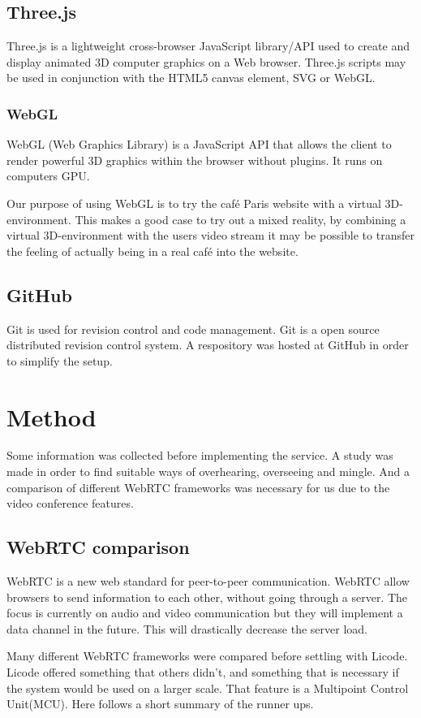 \documentclass[12pt, titlepage]{article}
\begin{document}
\subsection{Three.js}
Three.js\cite{34} is a lightweight cross-browser JavaScript library/API used to create and display animated 3D computer graphics on a Web browser. Three.js scripts may be used in conjunction with the HTML5 canvas element, SVG or WebGL.
\subsubsection{WebGL}
WebGL (Web Graphics Library) is a JavaScript API that allows the client to render powerful 3D graphics within the browser without plugins. It runs on computers GPU.

Our purpose of using WebGL is to try the café Paris website with a virtual 3D-environment. This makes a good case to try out a mixed reality, by combining a virtual 3D-environment with the users video stream it may be possible to transfer the feeling of actually being in a real café into the website.
\subsection{GitHub}
Git is used for revision control and code management. Git is a open source distributed revision control system. A respository was hosted at GitHub\cite{35} in order to simplify the setup.

\section{Method}
Some information was collected before implementing the service. A study was made in order to find suitable ways of overhearing, overseeing and mingle. And a comparison of different WebRTC frameworks was necessary for us due to the video conference features.
\subsection{WebRTC comparison}
WebRTC is a new web standard for peer-to-peer communication. WebRTC allow browsers to send information to each other, without going through a server. The focus is currently on audio and video communication but they will implement a data channel in the future. This will drastically decrease the server load.

Many different WebRTC frameworks were compared before settling with Licode. Licode offered something that others didn't, and something that is necessary if the system would be used on a larger scale. That feature is a Multipoint Control Unit(MCU). Here follows a short summary of the runner ups.
\end{document}

